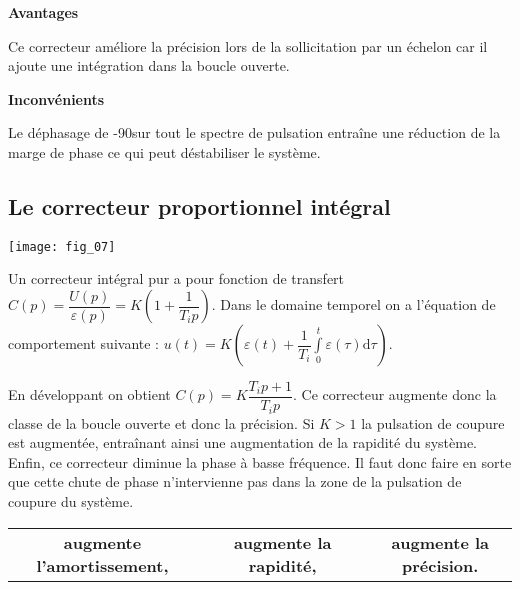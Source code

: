 \begin{resultat} 

\begin{multicols}{2}
\begin{center}
\textbf{Avantages}
\end{center}
Ce correcteur améliore la précision lors de la sollicitation par un échelon car il ajoute une intégration dans la boucle ouverte. 
\begin{center}
\textbf{Inconvénients}
\end{center}
Le déphasage de -90\degres sur tout le spectre de pulsation entraîne une réduction de la marge de phase ce qui peut déstabiliser le système. 
\end{multicols}
\end{resultat}

\subsection{Le correcteur proportionnel intégral}

\begin{marginfigure}
\texttt{[image: fig\_07]}
\end{marginfigure}

\begin{defi}[Correcteur PI]
Un correcteur intégral pur a pour fonction de transfert $C(p)=\dfrac{U(p)}{\varepsilon(p)}=K\left( 1+\dfrac{1}{T_i p}\right)$.
Dans le domaine temporel on a l'équation de comportement suivante : $u(t)=K\left(\varepsilon(t)+\dfrac{1}{T_i}\int\limits_0^t \varepsilon (\tau)\text{d}\tau\right)$.
\end{defi}

En développant on obtient $C(p)=K\dfrac{T_i p+1}{T_i p}$. Ce correcteur augmente donc la classe de la boucle ouverte et donc la précision. Si $K>1$ la pulsation de coupure est augmentée, entraînant ainsi une augmentation de la rapidité du système. Enfin, ce correcteur diminue la phase à basse fréquence. Il faut donc faire en sorte que cette chute de phase n'intervienne pas dans la zone de la pulsation de coupure du système.

\begin{resultat}[Correcteur PI]
\begin{center}
\begin{tabular}{ccccc}
\textbf{augmente l'amortissement,} &&
\textbf{augmente la rapidité,} && 
\textbf{augmente la précision.} \\
\end{tabular}
\end{center}
\end{resultat}



